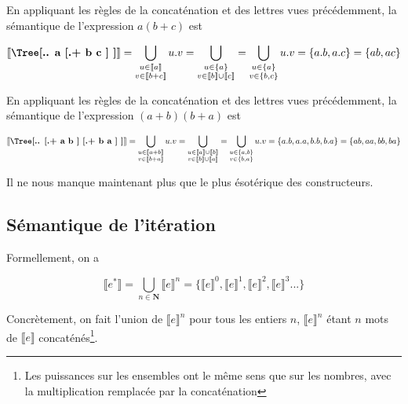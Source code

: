 \begin{example}
En appliquant les règles de la concaténation et des lettres vues précédemment, la sémantique de l'expression $a(b+c)$ est 

\[\mt{\Tree[.{.} a [.{+} b c ] ]} = \bigcup_{\substack{u \in \llbracket a \rrbracket \\ v \in \llbracket b + c \rrbracket }} u.v = \bigcup_{\substack{u \in \{a\} \\ v \in \llbracket b \rrbracket \cup \llbracket c \rrbracket}} = \bigcup_{\substack{u \in \{a\} \\ v \in \{b,c\} }} u.v = \{a.b, a.c\} = \{ab, ac\}\]
\end{example}

\begin{example}
En appliquant les règles de la concaténation et des lettres vues précédemment, la sémantique de l'expression $(a+b)(b+a)$ est 

\[\mt{\Tree[.{.} [.{+} a b ] [.{+} b a ] ]} = \bigcup_{\substack{u \in \llbracket a + b \rrbracket \\ v \in \llbracket b + a \rrbracket }} u.v = \bigcup_{\substack{u \in \llbracket a \rrbracket \cup \llbracket b \rrbracket \\ v \in \llbracket b \rrbracket \cup \llbracket a \rrbracket}} = \bigcup_{\substack{u \in \{a,b\} \\ v \in \{b,a\} }} u.v = \{a.b, a.a, b.b, b.a\} = \{ab, aa, bb, ba\}\]
\end{example}

Il ne nous manque maintenant plus que le plus ésotérique des constructeurs.

\subsection{Sémantique de l'itération}

Formellement, on a 

\[\llbracket e^* \rrbracket = \bigcup_{n \in \mathbf{N}} \llbracket e \rrbracket^n = \{\llbracket e \rrbracket^0, \llbracket e \rrbracket^1, \llbracket e \rrbracket^2, \llbracket e \rrbracket^3 ...\}\]


Concrètement, on fait l'union de $\llbracket e \rrbracket^n$ pour tous les entiers $n$, $\llbracket e \rrbracket^n$ étant $n$ mots de $\llbracket e \rrbracket$ concaténés\footnote{Les puissances sur les ensembles ont le même sens que sur les nombres, avec la multiplication remplacée par la concaténation}.

